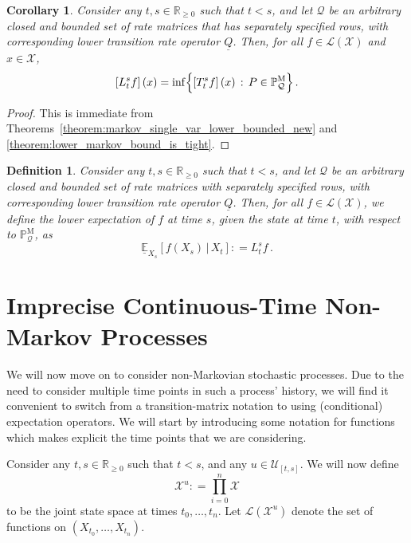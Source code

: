 \documentclass[10pt]{paper}
\newtheorem{corollary}[theorem]{Corollary}
\newtheorem{definition}{Definition}
\newcommand{\reals}{\mathbb{R}}
\newcommand{\realsnonneg}{\reals_{\geq 0}}
\newcommand{\states}{\mathcal{X}}
\newcommand{\processes}{\mathbb{P}}
\newcommand{\mprocesses}{\processes^{\mathrm{M}}}
\newcommand{\gambles}{\mathcal{L}}
\newcommand{\gamblesX}{\gambles(\states)}
\newcommand{\rateset}{\mathcal{Q}}
\newcommand{\lrate}{\underline{Q}}
\newcommand{\coloneqq}{:\!=}
\begin{document}
\begin{corollary}\label{cor:lower_operator_is_infimum}
Consider any $t,s\in\realsnonneg$ such that $t<s$, and let $\rateset$ be an arbitrary closed and bounded set of rate matrices that has separately specified rows, with corresponding lower transition rate operator $\lrate$. Then, for all $f\in\gamblesX$ and $x\in\states$,
\begin{equation*}
\left[L_t^sf\right](x) = \inf\Bigl\{\left[T_t^sf\right](x)\,:\,P\in\mprocesses_\rateset\Bigr\}\,.
\end{equation*}
\end{corollary}
\begin{proof}
This is immediate from Theorems~\ref{theorem:markov_single_var_lower_bounded_new} and \ref{theorem:lower_markov_bound_is_tight}.
\end{proof}

\begin{definition}\label{def:lower_expectation}
Consider any $t,s\in\realsnonneg$ such that $t<s$, and let $\mathcal{Q}$ be an arbitrary closed and bounded set of rate matrices with separately specified rows, with corresponding lower transition rate operator $\lrate$. Then, for all $f\in\gamblesX$, we define the \emph{lower expectation of $f$ at time $s$, given the state at time $t$, with respect to $\mprocesses_\rateset$}, as
\begin{equation*}
\underline{\mathbb{E}}_{X_s}\left[f(X_s)\,\vert\,X_t\right]\coloneqq L_t^sf\,.
\end{equation*}
\end{definition}

\section{Imprecise Continuous-Time Non-Markov Processes}\label{sec:imp_non_markov}

We will now move on to consider non-Markovian stochastic processes. Due to the need to consider multiple time points in such a process' history, we will find it convenient to switch from a transition-matrix notation to using (conditional) expectation operators. We will start by introducing some notation for functions which makes explicit the time points that we are considering.

Consider any $t,s\in\realsnonneg$ such that $t<s$, and any $u\in\mathcal{U}_{[t,s]}$. We will now define
\begin{equation*}
\states^u\coloneqq \prod_{i=0}^n\states
\end{equation*}
to be the joint state space at times $t_0,\ldots,t_n$. Let $\gambles(\states^u)$ denote the set of functions on $(X_{t_0},\ldots,X_{t_n})$.
\end{document}
